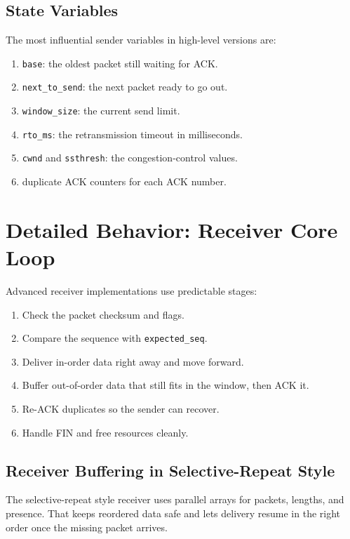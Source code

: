\subsection{State Variables}
The most influential sender variables in high-level versions are:

\begin{enumerate}
    \item \texttt{base}: the oldest packet still waiting for ACK.
    \item \texttt{next\_to\_send}: the next packet ready to go out.
    \item \texttt{window\_size}: the current send limit.
    \item \texttt{rto\_ms}: the retransmission timeout in milliseconds.
    \item \texttt{cwnd} and \texttt{ssthresh}: the congestion-control values.
    \item duplicate ACK counters for each ACK number.
\end{enumerate}

\clearpage
\section{Detailed Behavior: Receiver Core Loop}
Advanced receiver implementations use predictable stages:

\begin{enumerate}
    \item Check the packet checksum and flags.
    \item Compare the sequence with \texttt{expected\_seq}.
    \item Deliver in-order data right away and move forward.
    \item Buffer out-of-order data that still fits in the window, then ACK it.
    \item Re-ACK duplicates so the sender can recover.
    \item Handle FIN and free resources cleanly.
\end{enumerate}

\subsection{Receiver Buffering in Selective-Repeat Style}
The selective-repeat style receiver uses parallel arrays for packets, lengths,
and presence. That keeps reordered data safe and lets delivery resume in the
right order once the missing packet arrives.

